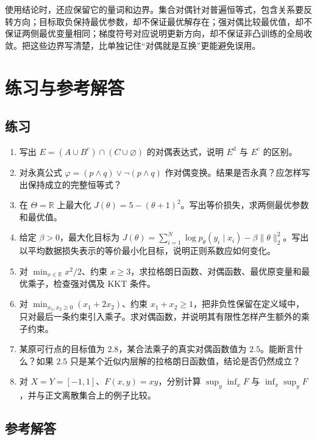 \documentclass[UTF8,12pt,a4paper,fontset=fandol]{ctexart}
\begin{document}
使用结论时，还应保留它的量词和边界。集合对偶针对普遍恒等式，包含关系要反转方向；目标取负保持最优参数，却不保证最优解存在；强对偶比较最优值，却不保证两侧最优变量相同；梯度符号对应说明更新方向，却不保证非凸训练的全局收敛。把这些边界写清楚，比单独记住“对偶就是互换”更能避免误用。

\section{练习与参考解答}
\label{sec:duality-exercises}

\subsection{练习}

\begin{enumerate}
 \item\label{exercise:duality-expression} 写出 $E=(A\cup B^c)\cap(C\cup\varnothing)$ 的对偶表达式，说明 $E^{\mathrm d}$ 与 $E^c$ 的区别。
 \item\label{exercise:duality-logic} 对永真公式 $\varphi=(p\land q)\lor\neg(p\land q)$ 作对偶变换。结果是否永真？应怎样写出保持成立的完整恒等式？
 \item\label{exercise:duality-score} 在 $\Theta=\mathbb R$ 上最大化 $J(\theta)=5-(\theta+1)^2$。写出等价损失，求两侧最优参数和最优值。
 \item\label{exercise:duality-regularizer} 给定 $\beta>0$，最大化目标为 $J(\theta)=\sum_{i=1}^N\log p_\theta(y_i\mid x_i)-\beta\|\theta\|_2^2$。写出以平均数据损失表示的等价最小化目标，说明正则系数应如何变化。
 \item\label{exercise:duality-quadratic} 对 $\min_{x\in\mathbb R}x^2/2$、约束 $x\geq3$，求拉格朗日函数、对偶函数、最优原变量和最优乘子，检查强对偶及 KKT 条件。
 \item\label{exercise:duality-domain} 对 $\min_{x_1,x_2\geq0}(x_1+2x_2)$、约束 $x_1+x_2\geq1$，把非负性保留在定义域中，只对最后一条约束引入乘子。求对偶函数，并说明其有限性怎样产生额外的乘子约束。
 \item\label{exercise:duality-upper} 某原可行点的目标值为 $2.8$，某合法乘子的真实对偶函数值为 $2.5$。能断言什么？如果 $2.5$ 只是某个近似内层解的拉格朗日函数值，结论是否仍然成立？
 \item\label{exercise:duality-minimax} 对 $X=Y=[-1,1]$、$F(x,y)=xy$，分别计算 $\sup_y\inf_xF$ 与 $\inf_x\sup_yF$，并与正文离散集合上的例子比较。
\end{enumerate}

\subsection{参考解答}
\end{document}
